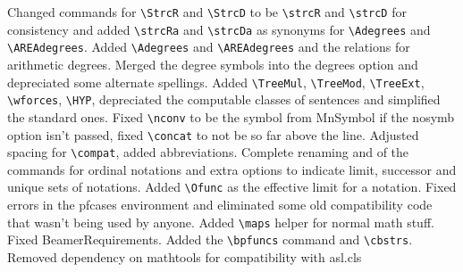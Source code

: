 \documentclass[leqno,11pt]{amsart}
\begin{document}
\begin{itemize}
	Changed commands for \verb=\StrcR= and \verb=\StrcD= to be \verb=\strcR= and \verb=\strcD= for consistency and added \verb=\strcRa= and \verb=\strcDa= as synonyms for \verb=\Adegrees= and \verb=\AREAdegrees=.  Added \verb=\Adegrees= and \verb=\AREAdegrees= and the relations for arithmetic degrees.  Merged the degree symbols into the degrees option and depreciated some alternate spellings.  Added \verb=\TreeMul=, \verb=\TreeMod=, \verb=\TreeExt=, \verb=\wforces=, \verb=\HYP=, depreciated the computable classes of sentences and simplified the standard ones.  Fixed \verb=\nconv= to be the symbol from MnSymbol if the nosymb option isn't passed, fixed \verb=\concat= to not be so far above the line.  Adjusted spacing for \verb=\compat=, added abbreviations.  Complete renaming and of the commands for ordinal notations and extra options to indicate limit, successor and unique sets of notations.  Added \verb=\Ofunc= as the effective limit for a notation.  Fixed errors in the pfcases environment and eliminated some old compatibility code that wasn't being used by anyone.  Added \verb=\maps= helper for normal math stuff.  Fixed BeamerRequirements.  Added the \verb=\bpfuncs= command and \verb=\cbstrs=.  Removed dependency on mathtools for compatibility with asl.cls


\end{itemize}
\end{document}
